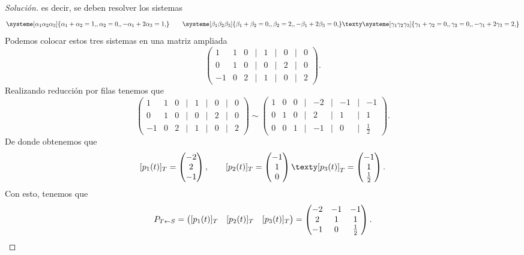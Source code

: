 \documentclass[a4,11pt]{aleph-notas}
\begin{document}
\begin{proof}[Solución]
    es decir, se deben resolver los sistemas
    \[
        \systeme[\alpha_1\alpha_2\alpha_3]{
        \alpha_1 + \alpha_2 = 1{,},
        \alpha_2 = 0{,},
        -\alpha_1+2\alpha_3 = 1{,}
        }
        \qquad
        \systeme[\beta_1\beta_2\beta_3]{
        \beta_1 + \beta_2 = 0{,},
        \beta_2 = 2{,},
        -\beta_1+2\beta_3 = 0{,}
        }
        \texty
        \systeme[\gamma_1\gamma_2\gamma_3]{
        \gamma_1 + \gamma_2 = 0{,},
        \gamma_2 = 0{,},
        -\gamma_1+2\gamma_3 = 2{,}
        }
    \]
    Podemos colocar estos tres sistemas en una matriz ampliada
    \[
        \begin{pmatrix}
             1 & 1 & 0 & | & 1 & | & 0 & | & 0\\
             0 & 1 & 0 & | & 0 & | & 2 & | & 0\\
            -1 & 0 & 2 & | & 1 & | & 0 & | & 2
        \end{pmatrix}.
    \]
    Realizando reducción por filas tenemos que
    \[
        \begin{pmatrix}
             1 & 1 & 0 & | & 1 & | & 0 & | & 0\\
             0 & 1 & 0 & | & 0 & | & 2 & | & 0\\
            -1 & 0 & 2 & | & 1 & | & 0 & | & 2
        \end{pmatrix}
        \sim
        \begin{pmatrix}
            1 & 0 & 0 & | & -2 & | & -1 & | & -1\\
            0 & 1 & 0 & | &  2 & | &  1 & | & 1\\
            0 & 0 & 1 & | & -1 & | &  0 & | & \frac 1 2
        \end{pmatrix}.
    \]
    De donde obtenemos que
    \[
        [p_1(t)]_T
        = \begin{pmatrix}
            -2\\2\\-1
        \end{pmatrix},
        \qquad
        [p_2(t)]_T
        = \begin{pmatrix}
            -1\\1\\0
        \end{pmatrix}
        \texty
        [p_3(t)]_T
        = \begin{pmatrix}
            -1\\1\\\frac 1 2
        \end{pmatrix}.
    \]
    Con esto, tenemos que
    \[
        P_{T\leftarrow S} = 
        \begin{pmatrix}
        [p_1(t)]_T & [p_2(t)]_T & [p_3(t)]_T
        \end{pmatrix}
        =
        \begin{pmatrix}
             -2 & -1 &  -1\\
              2 &  1 &  1\\
             -1 &  0 &  \frac 1 2
        \end{pmatrix}.
        \qedhere
    \]
\end{proof}
\end{document}
